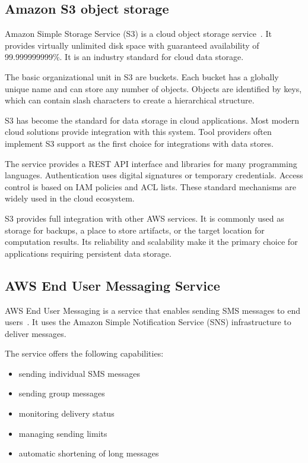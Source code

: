 \subsection{Amazon S3 object storage}\label{subsec:amazon-s3-object-storage}

Amazon Simple Storage Service (S3) is a cloud object storage service~\cite{aws_s3}.
It provides virtually unlimited disk space with guaranteed availability of 99.999999999\%.
It is an industry standard for cloud data storage.

The basic organizational unit in S3 are buckets.
Each bucket has a globally unique name and can store any number of objects.
Objects are identified by keys, which can contain slash characters to create a hierarchical structure.

S3 has become the standard for data storage in cloud applications.
Most modern cloud solutions provide integration with this system.
Tool providers often implement S3 support as the first choice for integrations with data stores.

The service provides a REST API interface and libraries for many programming languages.
Authentication uses digital signatures or temporary credentials.
Access control is based on IAM policies and ACL lists.
These standard mechanisms are widely used in the cloud ecosystem.

S3 provides full integration with other AWS services.
It is commonly used as storage for backups, a place to store artifacts, or the target location for computation results.
Its reliability and scalability make it the primary choice for applications requiring persistent data storage.

\subsection{AWS End User Messaging Service}

AWS End User Messaging is a service that enables sending SMS messages to end users~\cite{aws_messaging}.
It uses the Amazon Simple Notification Service (SNS) infrastructure to deliver messages.

The service offers the following capabilities:
\begin{itemize}
    \item sending individual SMS messages
    \item sending group messages
    \item monitoring delivery status
    \item managing sending limits
    \item automatic shortening of long messages
\end{itemize}

